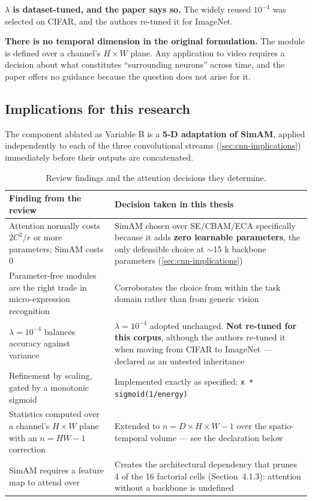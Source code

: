 \textbf{$\lambda$ is dataset-tuned, and the paper says so.} The widely reused $10^{-4}$ was selected on CIFAR, and the authors re-tuned it for ImageNet.

\textbf{There is no temporal dimension in the original formulation.} The module is defined over a channel's $H \times W$ plane. Any application to video requires a decision about what constitutes ``surrounding neurons'' across time, and the paper offers no guidance because the question does not arise for it.

\subsection{Implications for this research}
\label{sec:simam-implications}

The component ablated as Variable B is a \textbf{5-D adaptation of SimAM}, applied independently to each of the three convolutional streams (\autoref{sec:cnn-implications}) immediately before their outputs are concatenated.

\begin{table}[htbp]
	\centering
	\footnotesize
	\begin{tabular}{p{6.0cm} p{6.5cm}}
		\hline
		\textbf{Finding from the review} & \textbf{Decision taken in this thesis} \\
		\hline
		Attention normally costs $2C^2/r$ or more parameters; SimAM costs 0~\cite{yang2021} & SimAM chosen over SE/CBAM/ECA specifically because it adds \textbf{zero learnable parameters}, the only defensible choice at $\sim$15 k backbone parameters (\autoref{sec:cnn-implications}) \\
		Parameter-free modules are the right trade in micro-expression recognition~\cite{xia2020b} & Corroborates the choice from within the task domain rather than from generic vision \\
		$\lambda = 10^{-4}$ balances accuracy against variance~\cite{yang2021} & $\lambda = 10^{-4}$ adopted unchanged. \textbf{Not re-tuned for this corpus}, although the authors re-tuned it when moving from CIFAR to ImageNet --- declared as an untested inheritance \\
		Refinement by scaling, gated by a monotonic sigmoid~\cite{yang2021} & Implemented exactly as specified: \texttt{x * sigmoid(1/energy)} \\
		Statistics computed over a channel's $H\times W$ plane with an $n = HW-1$ correction~\cite{yang2021} & Extended to $n = D \times H \times W - 1$ over the spatio-temporal volume --- see the declaration below \\
		SimAM requires a feature map to attend over~\cite{yang2021} & Creates the architectural dependency that prunes 4 of the 16 factorial cells (Section~4.1.3): attention without a backbone is undefined \\
		\hline
	\end{tabular}
	\caption[Review findings and the attention decisions they determine]{Review findings and the attention decisions they determine.}
	\label{tab:simam-decisions}
\end{table}

